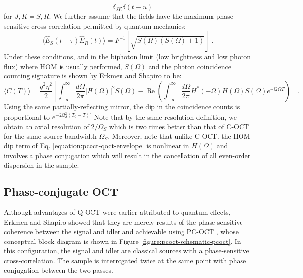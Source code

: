 \begin{equation}
[ \hat{E_J}(t), \hat{E_K}^\dagger(u) ] = \delta_{JK} \delta(t-u)
\end{equation}
for $J, K = S, R$. We further assume that the fields have the maximum phase-sensitive cross-correlation permitted by quantum mechanics:
\begin{equation}
\langle \hat{E}_S(t+\tau) \hat{E}_R(t) \rangle = F^{-1} [\sqrt{S(\Omega)(S(\Omega) +1)}]\,\,.
\end{equation}
Under these conditions, and in the biphoton limit (low brightness and low photon flux) where HOM is usually performed, $S(\Omega)$ and the photon coincidence counting signature is shown by Erkmen and Shapiro \cite{erkmen-pcoct} to be:
\begin{equation}
\langle C(T) \rangle = \frac{q^2\eta^2}{2} \left[ \int_{-\infty}^{\infty} \frac{d\Omega}{2\pi} |H(\Omega)|^2 S(\Omega) - \operatorname{Re}\left( \int_{-\infty}^{\infty} \frac{d\Omega}{2\pi} H^*(-\Omega)H(\Omega)S(\Omega)e^{-i2\Omega T} \right) \right]\,\,.
\label{equation:pcoct-qoct-envelope}
\end{equation}
Using the same partially-reflecting mirror, the dip in the coincidence counts is proportional to  $e^{-2\Omega_S^2 (T_0 - T)^2}$ Note that by the same resolution definition, we obtain an axial resolution of $2/\Omega_S$ which is two times better than that of C-OCT for the same source bandwidth $\Omega_S$. Moreover, note that unlike C-OCT, the HOM dip term of Eq. \ref{equation:pcoct-qoct-envelope} is nonlinear in $H(\Omega)$ and involves a phase conjugation which will result in the cancellation of all even-order dispersion in the sample.

\subsection{Phase-conjugate OCT}

Although advantages of Q-OCT were earlier attributed to quantum effects, Erkmen and Shapiro showed that they are merely results of the phase-sensitive coherence between the signal and idler and achievable using PC-OCT \cite{erkmen-pcoct}, whose conceptual block diagram is shown in Figure \ref{figure:pcoct-schematic-pcoct}. In this configuration, the signal and idler are classical sources with a phase-sensitive cross-correlation. The sample is interrogated twice at the same point with phase conjugation between the two passes.

